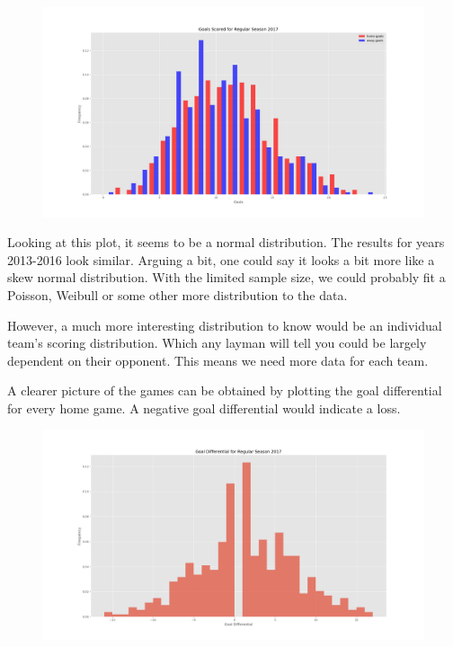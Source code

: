 \documentclass[11pt,a4paper]{article}
\begin{document}
\begin{figure}[htbp]
\includegraphics[width=\textwidth]{goals_2017.png}
\end{figure}

Looking at this plot, it seems to be a normal distribution. The results for years 2013-2016 look similar. Arguing a bit, one could say it looks a bit more like a skew normal distribution. With the limited sample size, we could probably fit a Poisson, Weibull or some other more distribution to the data. 

However, a much more interesting distribution to know would be an individual team's scoring distribution. Which any layman will tell you could be largely dependent on their opponent. This means we need more data for each team.

A clearer picture of the games can be obtained by plotting the goal differential for every home game. A negative goal differential would indicate a loss. 

\begin{figure}[htbp]
\includegraphics[width=\textwidth]{goal_diff_2017.png}
\end{figure}
\end{document}
